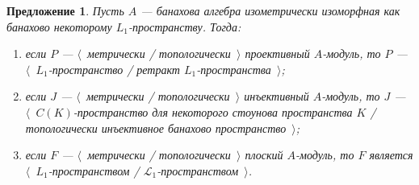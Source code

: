 \documentclass[12pt]{article}
\newtheorem{proposition}[theorem]{Предложение}
\begin{document}
\begin{proposition}\label{TopProjInjFlatModOverL1Charac} Пусть $A$ --- банахова
    алгебра изометрически изоморфная как банахово некоторому $L_1$-пространству.
    Тогда:
    \begin{enumerate}[label = (\roman*)]
        \item если $P$ --- $\langle$~метрически / топологически~$\rangle$
              проективный $A$-модуль, то $P$ --- $\langle$~$L_1$-пространство / ретракт
              $L_1$-пространства~$\rangle$;

        \item если $J$ --- $\langle$~метрически / топологически~$\rangle$
              инъективный $A$-модуль, то $J$ --- $\langle$~$C(K)$-пространство для
              некоторого стоунова пространства $K$ / топологически инъективное банахово
              пространство~$\rangle$;

        \item если $F$ --- $\langle$~метрически / топологически~$\rangle$ плоский
              $A$-модуль, то $F$ является $\langle$~$L_1$-пространством /
              $\mathscr{L}_1$-пространством~$\rangle$.
    \end{enumerate}

\end{proposition}
\end{document}
